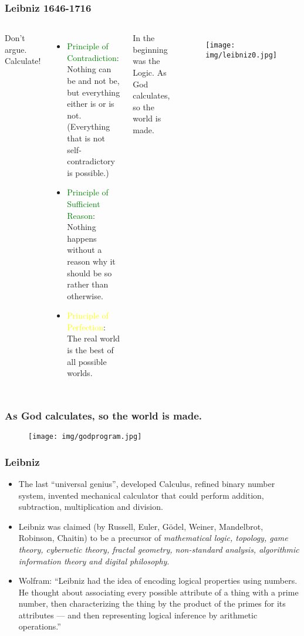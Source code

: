 \documentclass[UTF8,11pt,colorlinks,compress,openany]{beamer}%
\begin{document}
\begin{frame}\frametitle{Leibniz 1646-1716}
	\begin{columns}
			\begin{block}{}
				\centerline{\Large Don't argue. Calculate!}
			\end{block}
			\begin{itemize}
				\item \textcolor{green}{{\small Principle of Contradiction}}: Nothing can be and not be, but everything either is or is not. (Everything that is not self-contradictory is possible.)
				\item \textcolor{green}{{\small Principle of Sufficient Reason}}: Nothing happens without a reason why it should be so rather than otherwise.
				\item \textcolor{yellow}{{\small Principle of Perfection}}: The real world is the best of all possible worlds.
			\end{itemize}
			\begin{block}{In the beginning was the Logic.}
				As God calculates, so the world is made.
			\end{block}
			\begin{figure}
				\texttt{[image: img/leibniz0.jpg]}
			\end{figure}
	\end{columns}
\end{frame}

\begin{frame}\frametitle{As God calculates, so the world is made.}
\begin{figure}
	\texttt{[image: img/godprogram.jpg]}
\end{figure}
\end{frame}

\begin{frame}\frametitle{Leibniz}
	\begin{itemize}
		\item The last ``universal genius'', developed Calculus, refined binary number system, invented mechanical calculator that could perform addition, subtraction, multiplication and division.
		\item Leibniz was claimed (by Russell, Euler, G\"odel, Weiner, Mandelbrot, Robinson, Chaitin) to be a precursor of \emph{mathematical logic, topology, game theory, cybernetic theory, fractal geometry, non-standard analysis, algorithmic information theory and digital philosophy}.
		\item Wolfram: ``Leibniz had the idea of encoding logical properties using numbers. He thought about associating every possible attribute of a thing with a prime number, then characterizing the thing by the product of the primes for its attributes --- and then representing logical inference by arithmetic operations.''
	\end{itemize}
\end{frame}
\end{document}
